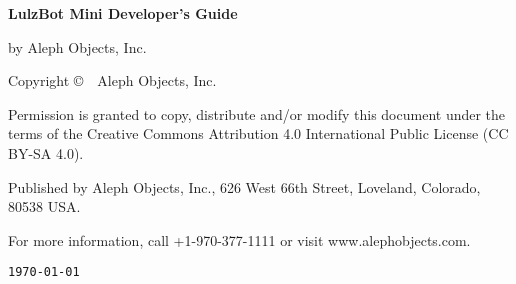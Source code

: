 %
%
%
%
%

\clearpage\null\vfill
\begingroup 
\thispagestyle{empty}
\footnotesize\raggedright
\setlength{\parskip}{0.5\baselineskip}

\textbf{LulzBot Mini Developer's Guide}

by Aleph Objects, Inc.

Copyright \copyright\ \the\year\ Aleph Objects, Inc.\par
Permission is granted to copy, distribute and\slash or modify 
this document under the terms of the
Creative Commons Attribution 4.0 International Public License
(CC BY-SA 4.0).

Published by Aleph Objects, Inc., 626 West 66th Street, Loveland, Colorado, 80538 USA.

For more information, call +1-970-377-1111 or visit www.alephobjects.com.

\renewcommand{\dateseparator}{}
\hfill\texttt{\yyyymmdddate\today} %
\endgroup
\pagebreak{}

